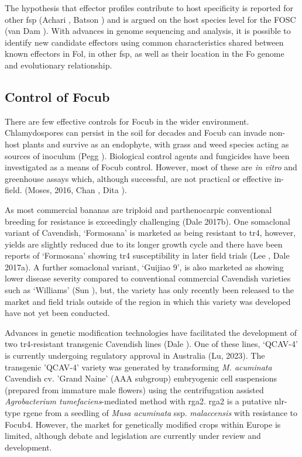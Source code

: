 The hypothesis that effector profiles contribute to host specificity is reported for other \ac{fsp} (Achari , Batson ) and is argued on the host species level for the \ac{FOSC} (van Dam ). With advances in genome sequencing and analysis, it is possible to identify new candidate effectors using common characteristics shared between known effectors in \ac{Fol}, in other \ac{fsp}, as well as their location in the \ac{Fo} genome and evolutionary relationship.

\subsection{Control of \acl{Focub}}

There are few effective controls for \ac{Focub} in the wider environment. Chlamydospores can persist in the soil for decades and \ac{Focub} can invade non-host plants and survive as an endophyte, with grass and weed species acting as sources of inoculum (Pegg ). Biological control agents and fungicides have been investigated as a means of \ac{Focub} control. However, most of these are \textit{in vitro} and greenhouse assays which, although successful, are not practical or effective in-field. (Moses, 2016, Chan , Dita ).  

As most commercial bananas are triploid and parthenocarpic conventional breeding for resistance is exceedingly challenging (Dale \et 2017b). One somaclonal variant of Cavendish, ‘Formosana’ is marketed as being resistant to \ac{tr4}, however, yields are slightly reduced due to its longer growth cycle and there have been reports of  ‘Formosana’ showing \ac{tr4} susceptibility in later field trials (Lee , Dale \et 2017a). A further somaclonal variant, ‘Guijiao 9’, is also marketed as showing lower disease severity compared to conventional commercial Cavendish varieties such as ‘Williams’ (Sun ), but, the variety has only recently been released to the market and field trials outside of the region in which this variety was developed have not yet been conducted.  

Advances in genetic modification technologies have facilitated the development of two \ac{tr4}-resistant transgenic Cavendish lines (Dale ). One of these lines, ‘QCAV-4’ is currently undergoing regulatory approval in Australia (Lu, 2023). The transgenic 'QCAV-4' variety was generated by transforming \textit{M. acuminata }Cavendish cv. 'Grand Naine' (AAA subgroup) embryogenic cell suspensions (prepared from immature male flowers) using the centrifugation assisted \textit{Agrobacterium tumefaciens}-mediated method with \ac{rga2}. \ac{rga2} is a putative \ac{nlr}-type \ac{rgene} from a seedling of \textit{Musa acuminata} ssp. \textit{malaccensis} with resistance to \ac{Focub4}. However, the market for genetically modified crops within Europe is limited, although debate and legislation are currently under review and development. 

